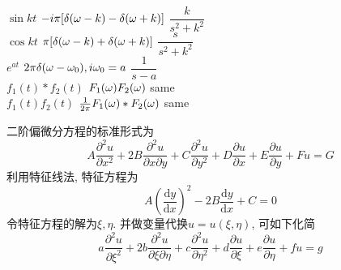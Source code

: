 \documentclass[UTF8,8pt]{ctexart}
\begin{document}
\begin{multicols}{2}
\begin{tabbing}
    $\sin kt$ 	                                \>$-i\pi[\delta(\omega-k)-\delta(\omega+k)]$        \> $\dfrac{k}{s^2+k^2}$  \\
    $\cos kt$ 	                                \>$\pi[\delta(\omega-k)+\delta(\omega+k)]$        \> $\dfrac{s}{s^2+k^2}$  \\
    $e^{at}$ 	                                \>$2\pi\delta(\omega-\omega_0),i\omega_0=a$        \> $\dfrac{1}{s-a}$ 	  \\
    $f_1(t)*f_2(t)$                             \>$F_1(\omega)F_2(\omega)$                 \>same\\
    $f_1(t)f_2(t)$                              \>$\frac{1}{2\pi}F_1(\omega)*F_2(\omega)$       \>same
    \end{tabbing}
    二阶偏微分方程的标准形式为
    $$ 
    A \frac{\partial^{2} u}{\partial x^{2}}+2 B \frac{\partial^{2} u}{\partial x \partial y}+C \frac{\partial^{2} u}{\partial y^{2}}+D \frac{\partial u}{\partial x}+E \frac{\partial u}{\partial y}+F u=G
    $$
    利用特征线法, 特征方程为$$ 
    A\left(\frac{\mathrm{d} y}{\mathrm{d} x}\right)^{2}-2 B \frac{\mathrm{d} y}{\mathrm{d} x}+C=0
    $$
    令特征方程的解为$\xi,\eta$. 并做变量代换$u=u(\xi,\eta)$, 可如下化简
    $$ 
    a \frac{\partial^{2} u}{\partial \xi^{2}}+2 b \frac{\partial^{2} u}{\partial \xi \partial \eta}+c \frac{\partial^{2} u}{\partial \eta^{2}}+d \frac{\partial u}{\partial \xi}+e \frac{\partial u}{\partial \eta}+f u=g
    $$
    $$ 
$$
\end{multicols}
\end{document}
